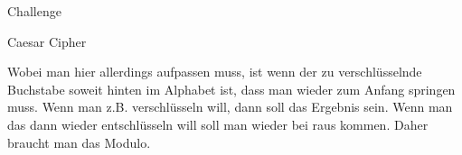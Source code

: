 \begin{task}[points=auto]{Challenge}
\begin{subtask*}[points=0]{Caesar Cipher }
\begin{solution}
            Wobei man hier allerdings aufpassen muss, ist wenn der zu verschlüsselnde Buchstabe soweit hinten im Alphabet ist, dass man wieder zum Anfang springen muss. Wenn man z.B.  verschlüsseln will, dann soll das Ergebnis  sein. Wenn man das  dann wieder entschlüsseln will soll man wieder bei  raus kommen. Daher braucht man das Modulo.
        \end{solution}
    \end{subtask*}
\end{task}

